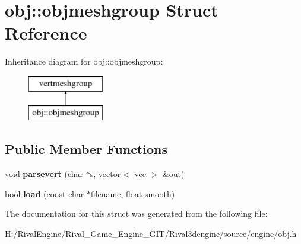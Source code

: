 \hypertarget{structobj_1_1objmeshgroup}{}\section{obj\+:\+:objmeshgroup Struct Reference}
\label{structobj_1_1objmeshgroup}
Inheritance diagram for obj\+:\+:objmeshgroup\+:\begin{figure}[H]
\begin{center}
\leavevmode
\includegraphics[height=2.000000cm]{structobj_1_1objmeshgroup}
\end{center}
\end{figure}
\subsection*{Public Member Functions}
\begin{DoxyCompactItemize}
\item 
\mbox{\label{structobj_1_1objmeshgroup_a335e911a486593b74e22298c1cf663e6}} 
void {\bfseries parsevert} (char $\ast$s, \hyperlink{structvector}{vector}$<$ \hyperlink{structvec}{vec} $>$ \&out)
\item 
\mbox{\label{structobj_1_1objmeshgroup_a68586898491e9dae30c584b6f579cef7}} 
bool {\bfseries load} (const char $\ast$filename, float smooth)
\end{DoxyCompactItemize}


The documentation for this struct was generated from the following file\+:\begin{DoxyCompactItemize}
\item 
H\+:/\+Rival\+Engine/\+Rival\+\_\+\+Game\+\_\+\+Engine\+\_\+\+G\+I\+T/\+Rival3dengine/source/engine/obj.\+h\end{DoxyCompactItemize}
